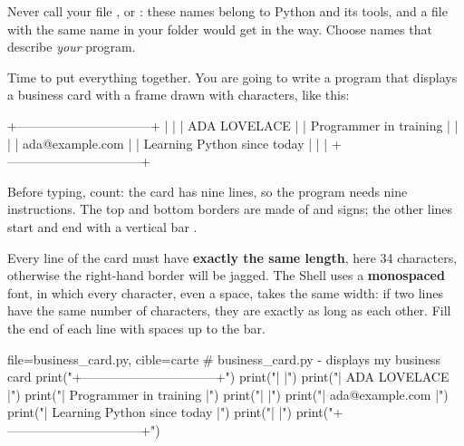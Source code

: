 \begin{attention}
Never call your file ,  or : these names belong to Python
and its tools, and a file with the same name in your folder would get in the way. Choose names that
describe \emph{your} program.
\end{attention}


Time to put everything together. You are going to write a program that displays a business card
with a frame drawn with characters, like this:

\begin{sortie}
+--------------------------------+
|                                |
|   ADA LOVELACE                 |
|   Programmer in training       |
|                                |
|   ada@example.com              |
|   Learning Python since today  |
|                                |
+--------------------------------+
\end{sortie}

Before typing, count: the card has nine lines, so the program needs nine 
instructions. The top and bottom borders are made of \py{+} and \py{-} signs; the other lines start
and end with a vertical bar \py{|}.

Every line of the card must have \textbf{exactly the same length}, here 34 characters, otherwise the
right-hand border will be jagged. The Shell uses a \textbf{monospaced} font, in which every
character, even a space, takes the same width: if two lines have the same number of characters,
they are exactly as long as each other. Fill the end of each line with spaces up to the bar.

\begin{code}{file=business_card.py, cible=carte}
# business_card.py - displays my business card
print("+--------------------------------+")
print("|                                |")
print("|   ADA LOVELACE                 |")
print("|   Programmer in training       |")
print("|                                |")
print("|   ada@example.com              |")
print("|   Learning Python since today  |")
print("|                                |")
print("+--------------------------------+")
\end{code}

